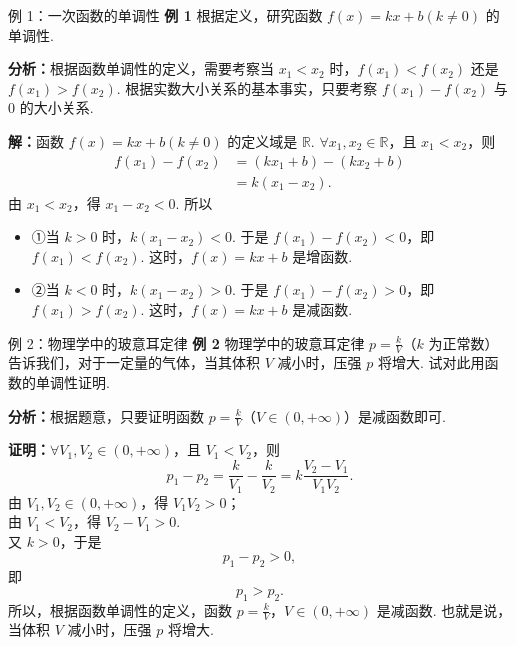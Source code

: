 \documentclass[aspectratio=169, 10pt]{beamer}
\begin{document}
	\begin{frame}{例 1：一次函数的单调性}
		\textbf{\textcolor{myblue}{例 1}} 根据定义，研究函数 \(f(x)=kx+b(k \neq 0)\) 的单调性.
		
		\vspace{0.2cm}
		\textbf{\textcolor{myorange}{分析：}}根据函数单调性的定义，需要考察当 \(x_1 < x_2\) 时，\(f(x_1) < f(x_2)\) 还是 \(f(x_1) > f(x_2)\). 根据实数大小关系的基本事实，只要考察 \(f(x_1) - f(x_2)\) 与 \(0\) 的大小关系.
		
		\vspace{0.2cm}
		\textbf{\textcolor{myblue}{解：}}函数 \(f(x)=kx+b(k \neq 0)\) 的定义域是 \(\mathbb{R}\). \(\forall x_1, x_2 \in \mathbb{R}\)，且 \(x_1 < x_2\)，则
		\begin{align*}
			f(x_1) - f(x_2) &= (kx_1 + b) - (kx_2 + b) \\
			&= k(x_1 - x_2).
		\end{align*}
		由 \(x_1 < x_2\)，得 \(x_1 - x_2 < 0\). 所以
		\begin{itemize}
			\item ①当 \(k > 0\) 时，\(k(x_1 - x_2) < 0\). 于是 \(f(x_1) - f(x_2) < 0\)，即 \(f(x_1) < f(x_2)\). 这时，\(f(x)=kx+b\) 是增函数.
			\item ②当 \(k < 0\) 时，\(k(x_1 - x_2) > 0\). 于是 \(f(x_1) - f(x_2) > 0\)，即 \(f(x_1) > f(x_2)\). 这时，\(f(x)=kx+b\) 是减函数.
		\end{itemize}
	\end{frame}
	
	\begin{frame}{例 2：物理学中的玻意耳定律}
		\textbf{\textcolor{myblue}{例 2}} 物理学中的玻意耳定律 \(p=\frac{k}{V}\)（\(k\) 为正常数）告诉我们，对于一定量的气体，当其体积 \(V\) 减小时，压强 \(p\) 将增大. 试对此用函数的单调性证明.
		
		\vspace{0.2cm}
		\textbf{\textcolor{myorange}{分析：}}根据题意，只要证明函数 \(p=\frac{k}{V}\)（\(V \in (0, +\infty)\)）是减函数即可.
		
		\vspace{0.2cm}
		\textbf{\textcolor{myblue}{证明：}}\(\forall V_1, V_2 \in (0, +\infty)\)，且 \(V_1 < V_2\)，则
		\[
		p_1 - p_2 = \frac{k}{V_1} - \frac{k}{V_2} = k\frac{V_2 - V_1}{V_1V_2}.
		\]
		由 \(V_1, V_2 \in (0, +\infty)\)，得 \(V_1V_2 > 0\)；\\
		由 \(V_1 < V_2\)，得 \(V_2 - V_1 > 0\).\\
		又 \(k > 0\)，于是
		\[
		p_1 - p_2 > 0,
		\]
		即
		\[
		p_1 > p_2.
		\]
		所以，根据函数单调性的定义，函数 \(p=\frac{k}{V}\)，\(V \in (0, +\infty)\) 是减函数. 也就是说，当体积 \(V\) 减小时，压强 \(p\) 将增大.
	\end{frame}
	
\end{document}
